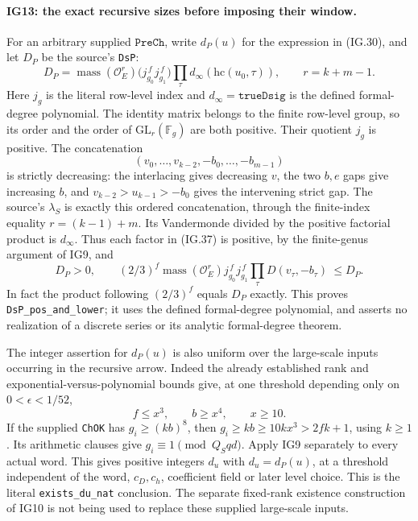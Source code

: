 \paragraph{IG13: the exact recursive sizes before imposing their window.}
For an arbitrary supplied $\texttt{PreCh}$, write $d_P(u)$ for
the expression in (IG.30), and let $D_P$ be the source's
\texttt{DsP}:
\[
 D_P=\operatorname{mass}(\mathcal O_E^r)
        \bigl(j_{g_0}^{\,f}j_{g_1}^{\,f}\bigr)
        \prod_\tau d_\infty(\mathrm{hc}(u_0,\tau)),
 \qquad r=k+m-1.                                      \tag{IG.37}
\]
Here $j_g$ is the literal row-level index and
$d_\infty=\texttt{trueDsig}$ is the defined formal-degree
polynomial. The identity matrix belongs to the finite row-level
group, so its order and the order of $\mathrm{GL}_r(\mathbb F_g)$
are both positive. Their quotient $j_g$ is positive. The
concatenation
\[
       (v_0,\ldots,v_{k-2},-b_0,\ldots,-b_{m-1})
\]
is strictly decreasing: the interlacing gives decreasing $v$,
the two $b,e$ gaps give increasing $b$, and
$v_{k-2}>u_{k-1}>-b_0$ gives the intervening strict gap.
The source's $\lambda_S$ is exactly this ordered concatenation,
through the finite-index equality $r=(k-1)+m$. Its
Vandermonde divided by the positive factorial product is
$d_\infty$. Thus each factor in (IG.37) is positive, by the
finite-genus argument of IG9, and
\[
 D_P>0,\qquad
 (2/3)^f\operatorname{mass}(\mathcal O_E^r)
       j_{g_0}^{\,f}j_{g_1}^{\,f}
       \prod_\tau D(v_\tau,-b_\tau)\ \le D_P.           \tag{IG.38}
\]
In fact the product following $(2/3)^f$ equals $D_P$ exactly.
This proves \texttt{DsP\_pos\_and\_lower}; it uses the defined
formal-degree polynomial, and asserts no realization of a
discrete series or its analytic formal-degree theorem.

The integer assertion for $d_P(u)$ is also uniform over the
large-scale inputs occurring in the recursive arrow. Indeed
the already established rank and exponential-versus-polynomial
bounds give, at one threshold depending only on
$0<\epsilon<1/52$,
\[
       f\le x^3,\qquad b\ge x^4,\qquad x\ge10.
\]
If the supplied \texttt{ChOK} has $g_i\ge(kb)^8$, then
$g_i\ge kb\ge10kx^3>2fk+1$, using $k\ge1$.
Its arithmetic clauses give $g_i\equiv1\pmod {Q_Sqd}$.
Apply IG9 separately to every actual word. This gives positive
integers $d_u$ with $d_u=d_P(u)$, at a threshold independent of
the word, $c_D,c_h$, coefficient field or later level choice.
This is the literal \texttt{exists\_du\_nat} conclusion.
The separate fixed-rank existence construction of IG10 is not
being used to replace these supplied large-scale inputs.


